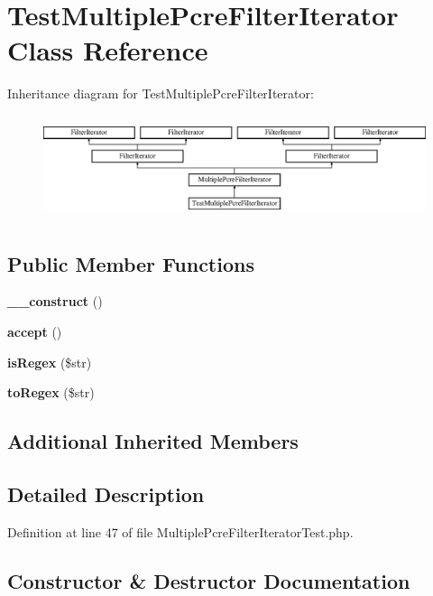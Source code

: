 \section{Test\+Multiple\+Pcre\+Filter\+Iterator Class Reference}
\label{class_symfony_1_1_component_1_1_finder_1_1_tests_1_1_iterator_1_1_test_multiple_pcre_filter_iterator}
Inheritance diagram for Test\+Multiple\+Pcre\+Filter\+Iterator\+:\begin{figure}[H]
\begin{center}
\leavevmode
\includegraphics[height=3.060109cm]{class_symfony_1_1_component_1_1_finder_1_1_tests_1_1_iterator_1_1_test_multiple_pcre_filter_iterator}
\end{center}
\end{figure}
\subsection*{Public Member Functions}
\begin{DoxyCompactItemize}
\item 
{\bf \+\_\+\+\_\+construct} ()
\item 
{\bf accept} ()
\item 
{\bf is\+Regex} (\$str)
\item 
{\bf to\+Regex} (\$str)
\end{DoxyCompactItemize}
\subsection*{Additional Inherited Members}


\subsection{Detailed Description}


Definition at line 47 of file Multiple\+Pcre\+Filter\+Iterator\+Test.\+php.



\subsection{Constructor \& Destructor Documentation}
